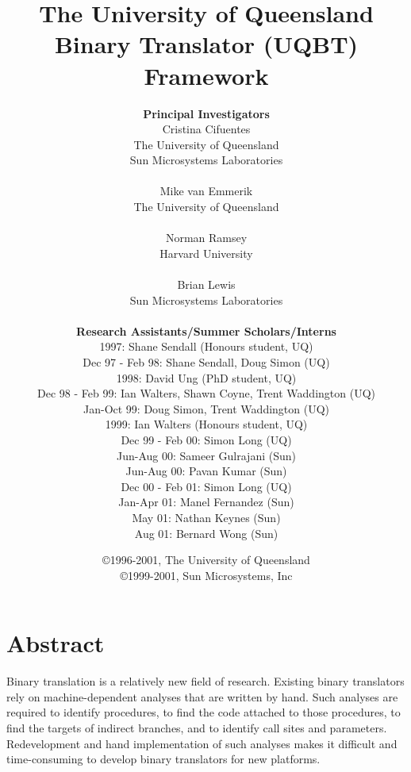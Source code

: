 \documentclass[letter]{book}
\begin{document}
\title{\large \bf The University of Queensland Binary Translator (UQBT) Framework} 
\author{
{\bf Principal Investigators} \\
Cristina Cifuentes \\
	The University of Queensland \\
	Sun Microsystems Laboratories \\ \\
Mike van Emmerik \\
 	The University of Queensland \\ \\ 
Norman Ramsey \\
	Harvard University \\ \\ 
Brian Lewis \\
	Sun Microsystems Laboratories \\ 
\vspace*{-0.2cm} \\
{\bf Research Assistants/Summer Scholars/Interns} \\
	1997: Shane Sendall (Honours student, UQ) \\
	Dec 97 - Feb 98: Shane Sendall, Doug Simon (UQ) \\
	1998: David Ung (PhD student, UQ) \\
	Dec 98 - Feb 99: Ian Walters, Shawn Coyne, Trent Waddington (UQ) \\
	Jan-Oct 99: Doug Simon, Trent Waddington (UQ) \\
	1999: Ian Walters (Honours student, UQ) \\ 
	Dec 99 - Feb 00: Simon Long (UQ) \\
    Jun-Aug 00: Sameer Gulrajani (Sun) \\ 
    Jun-Aug 00: Pavan Kumar (Sun) \\ 
	Dec 00 - Feb 01: Simon Long (UQ) \\
	Jan-Apr 01: Manel Fernandez (Sun) \\
    May 01: Nathan Keynes (Sun) \\
    Aug 01: Bernard Wong (Sun) 
}
\date{
	\vspace*{-0.3cm}
	\copyright 1996-2001, The University of Queensland \\
	\copyright 1999-2001, Sun Microsystems, Inc } 
\maketitle


\section*{Abstract}
Binary translation is a relatively new field of research.  Existing binary
translators rely on machine-dependent analyses that are written by
hand.  Such analyses are required to identify procedures, to find the
code attached to those procedures, to find the targets of indirect
branches, and to identify call sites and parameters.  Redevelopment
and hand implementation of such analyses makes it difficult and
time-consuming to develop binary translators for new platforms.
\end{document}
